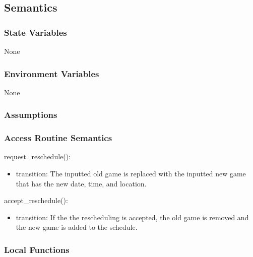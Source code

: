\documentclass[12pt, titlepage]{article}
\begin{document}
\subsection{Semantics}

\subsubsection{State Variables}

None

\subsubsection{Environment Variables}

None

\subsubsection{Assumptions}


\subsubsection{Access Routine Semantics}

\noindent request\_reschedule():
\begin{itemize}
\item transition: The inputted old game is replaced with the inputted new game that has
      the new date, time, and location.
\end{itemize}

\noindent accept\_reschedule():
\begin{itemize}
\item transition: If the the rescheduling is accepted, the old game is removed and the
      new game is added to the schedule.
\end{itemize}

\subsubsection{Local Functions}

 
\end{document}
